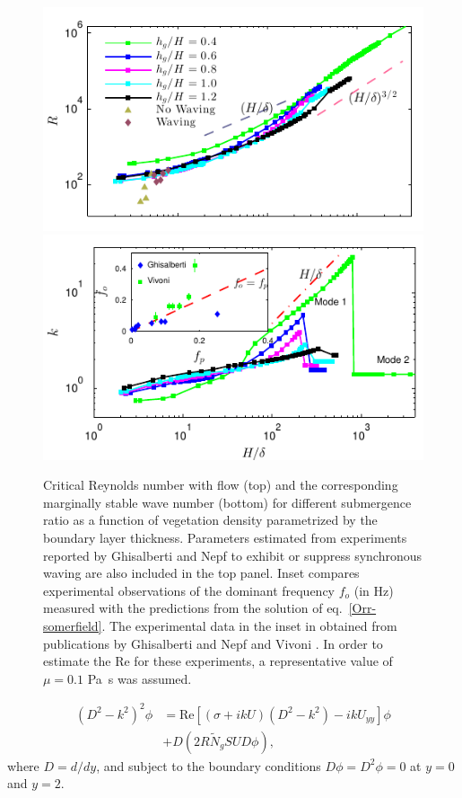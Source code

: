 \documentclass[aps,prl,twocolumn,superscriptaddress,10pt]{revtex4-1}  %
\newcommand{\Rey}{\text{Re}}
\newcommand{\Ndg}{\tilde{N}_g}
\begin{document}
\begin{figure}
\begin{center}
\includegraphics[]{Critical_Re_vs_delta_noshear} \\
\vspace{-6mm} \hspace{-3mm}
\includegraphics[]{K_vs_shear_width_noshear}
\end{center}
\caption{Critical Reynolds number with flow (top) and the corresponding marginally stable wave number (bottom) for different submergence ratio as a function of vegetation density
 parametrized by the boundary layer thickness. Parameters estimated from experiments reported by Ghisalberti and Nepf \cite{Ghisal02} to exhibit or suppress synchronous waving are 
also included in the top panel. Inset compares experimental observations 
of the dominant frequency $f_o$ (in Hz) measured with the predictions from the solution of eq.~\eqref{Orr-somerfield}. The experimental data in the inset in obtained from publications by 
Ghisalberti and Nepf \cite{Ghisal02} and Vivoni \cite{Vivoni98}. In order to estimate the $\Rey$ for these experiments, a representative value of $\mu=0.1$ Pa~s was assumed.}
\label{Re_vs_delta}
\end{figure}
\begin{equation}
\begin{split}
\left(D^2 -k^{2} \right)^2\phi &= \Rey \left[ \left({\sigma}+ikU\right) \left(D^2-k^2\right) -ikU_{yy}\right]\phi \\
&+D\left(2R \Ndg S U D \phi\right),
\label{Orr-somerfield}
\end{split}
\end{equation}
where $D=d/dy$, and subject to the boundary conditions $D\phi = D^2\phi = 0$ at $y=0$ and $y=2$. 
\end{document}

